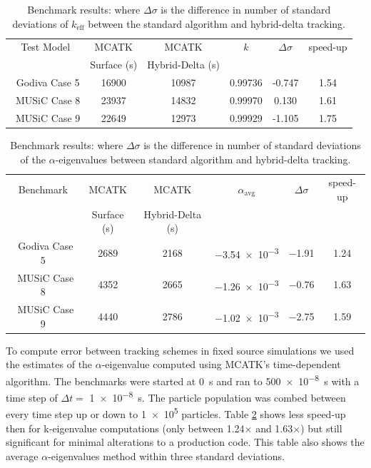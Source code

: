 \begin{table}[!htb]
  \centering
  \caption{Benchmark results: where ${\Delta \sigma}$ is the difference in number of standard deviations of ${k_{\text{eff}}}$ between the standard algorithm and hybrid-delta tracking.}
  \label{table:runtime} 
  \begin{tabular}{c c c c c c  } \hline 
    Test Model & MCATK & MCATK & $k$ & $\Delta \sigma$ & speed-up\\
               & Surface (s)  & Hybrid-Delta (s) &  & &\\ \hline
    \ Godiva Case 5 & 16900 &  10987 & 0.99736 &  -0.747 & 1.54 \\
    \ MUSiC Case 8  & 23937 &  14832 & 0.99970 &  0.130 & 1.61 \\
    \ MUSiC Case 9  & 22649 &  12973 & 0.99929 &  -1.105 & 1.75 \\ 
    \hline
  \end{tabular}
\end{table}


\begin{table}[!htb]
  \centering
  \caption{Benchmark results: where $\Delta \sigma$ is the difference in number of standard deviations of the $\alpha$-eigenvalues between standard algorithm and hybrid-delta tracking.}
  \label{table:runtime_trans} 
  \begin{tabular}{c c c c c c } \hline 
    Benchmark & MCATK            & MCATK         & $\alpha_{\text{avg}}$ & $\Delta \sigma$ & speed-up\\
               & Surface (s)  & Hybrid-Delta (s) & &                 &\\ \hline
    \ Godiva Case 5 & 2689 &  2168 & \num{-3.54e-3} &  \num{-1.91} & 1.24 \\
    \ MUSiC Case 8  & 4352 &  2665 & \num{-1.26e-3} &  \num{-0.76} & 1.63 \\
    \ MUSiC Case 9  & 4440 &  2786 & \num{-1.02e-3} &  \num{-2.75} & 1.59 \\ 
    \hline
  \end{tabular}
\end{table}

To compute error between tracking schemes in fixed source simulations we used the estimates of the $\alpha$-eigenvalue computed using MCATK's time-dependent algorithm.
The benchmarks were started at \SI{0}{\second} and ran to \SI{500e-8}{\second} with a time step of $\Delta t =$ \SI{1e-8}{\second}.
The particle population was combed between every time step up or down to \num{1e5} particles. 
Table \ref{table:runtime_trans} shows less speed-up then for k-eigenvalue computations (only between 1.24$\times$ and 1.63$\times$) but still significant for minimal alterations to a production code. This table also shows the average $\alpha$-eigenvalues method within three standard deviations.


